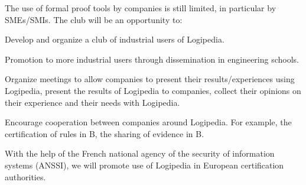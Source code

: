 \begin{workpackage}[id=dissemination,type=MGT,
  short={Dissemination},
  title={Dissemination, communication and exploitation},
  lead=Inr,InrRM=12,BirRM=4,IrtRM=4,ImtRM=2,StrRM=2,ZibRM=14,EduRM=12]
\begin{tasklist}
  \begin{task}[id=industrial-club,
    title=Expanding the use of Logipedia in the industry,
    lead=Irt,IrtRM=2,wphases=7-42!.1]
    The use of formal proof tools by companies is still limited, in particular by SMEs/SMIs. The club will be an opportunity to:
    \begin{compactitem}
    \item Develop and organize a club of industrial users of Logipedia.
    \item Promotion to more industrial users through dissemination in engineering schools.
    \item Organize meetings to allow companies to present their results/experiences using Logipedia, present the results of Logipedia to companies, collect their opinions on their experience and their needs with Logipedia.
    \item Encourage cooperation between companies around Logipedia. For example, the certification of rules in B, the sharing of evidence in B.
    \end{compactitem}
  \end{task}

  \begin{task}[id=certifiers-club,
      title=Promoting the use of Logipedia by certification
      authorities, lead=Imt,ImtRM=2,wphases=7-42!.05]

    With the help of the French national agency of the security of
    information systems (ANSSI), we will promote use of Logipedia in
    European certification authorities.


\end{task}
\end{tasklist}
\end{workpackage}
